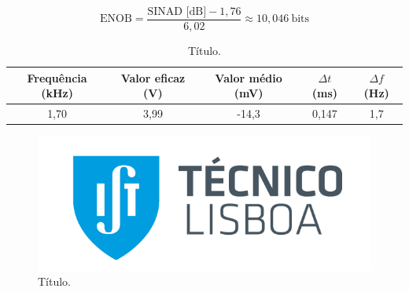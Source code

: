 
\vspace*{-0.3cm}
\begin{equation}
    \text{ENOB} = \frac{\text{SINAD [dB]} - 1,76}{6,02} \approx 10,046\:\text{bits}
    \label{eq:exemplo}
\end{equation}


\vspace*{0.2cm}
\begin{table}[H]
    \centering
    \caption{Título.}
    \label{tab:exemplo}
    \begin{tabular}{|c|c|c|c|c|}
    \hline
    \cellcolor[HTML]{EFEFEF} Frequência (kHz)   &  \cellcolor[HTML]{EFEFEF} Valor eficaz (V) & \cellcolor[HTML]{EFEFEF} Valor médio (mV) &\cellcolor[HTML]{EFEFEF} $\Delta t$ (ms) & \cellcolor[HTML]{EFEFEF} $\Delta f$ (Hz) \\ \hline
     1,70     & 3,99 & -14,3 & 0,147 & 1,7    \\ \hline
    \end{tabular}
\end{table}


\begin{figure}[H]
    \centering
    \includegraphics[scale = 0.6]{imagens/ist.png} 
    \caption{Título.}
    \label{fig:exemplo.1}
\end{figure}


